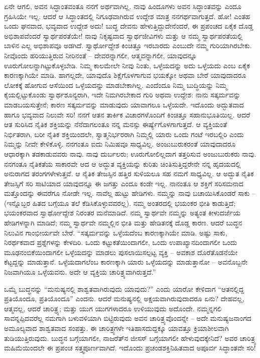 ಏನೇ ಆಗಲಿ, ಅವನ ಸಿದ್ಧಾಂತವಂತೂ ನನಗೆ ಅರ್ಥವಾಗಿಲ್ಲ. ನಾವು ಹಿಂದೂಗಳು ಅವನ ಸಿದ್ಧಾಂತವನ್ನು ಎಂದೂ ಗ್ರಹಿಸಿಯೇ ಇಲ್ಲ. ಆದರೆ ಆ ಸಿದ್ಧಾಂತದಲ್ಲಿ ನಿಗೂಢವಾಗಿರುವ ಉದ್ದೇಶ ಮಾತ್ರ ನನಗರ್ಥವಾಗುತ್ತದೆ. ಹೋ! ಎಂತಹ ಒಂದು ಘನವಾದ, ಭವ್ಯವಾದ ಉದ್ದೇಶ ಅದು! ಬುದ್ಧ ದೇವನು ಹೇಳುತ್ತಿದ್ದುದೇನೆಂದರೆ, ಈ ಪ್ರಪಂಚದ ಏಕೈಕ ದೊಡ್ಡ ಅಭಿಶಾಪವೆಂದರೆ ಸ್ವಾರ್ಥಪರತೆಯೇ! ನಾವು ನಿಕೃಷ್ಟವಾದ ಸ್ವಾರ್ಥಜೀವಿಗಳು ಮತ್ತು ಆ ನಮ್ಮ ಸ್ವಾರ್ಥಪರತೆಯಲ್ಲಿ ಬಾಳಿನ ಎಲ್ಲ ಅಭಿಶಾಪವೂ ಅಡಗಿದೆ. ಸ್ವಾರ್ಥೋದ್ದೇಶ ಕಿಂಚಿತ್ತೂ ಇರಬಾರದು ಎಂಬುದೇ ನಮ್ಮ ಗುರಿಯಾಗಿರಬೇಕು. ನೀವೊಂದು ಹರಿಯುತ್ತಿರುವ ನೀರಿನಂತೆ – ದೇವರನ್ನಾಗಲೀ, ಆತ್ಮವನ್ನಾಗಲೀ, ಯಾವುದನ್ನೂ ಊರುಗೋಲನ್ನಾಗಿಟ್ಟುಕೊಳ್ಳಬೇಡಿ. ನಿಮ್ಮ ಕಾಲಮೇಲೇ ನೀವು ನಿಂತು, ಒಳ್ಳೆಯದನ್ನು ಅದು ಒಳ್ಳೆಯದು ಎಂಬ ಏಕೈಕ ಕಾರಣಕ್ಕಾಗಿಯೇ ಮಾಡಿ. ಹಾಗಲ್ಲದೇ, ಯಾವುದೊ ಶಿಕ್ಷೆಗೊಳಗಾಗುವ ಭಯಕ್ಕೋ ಅಥವಾ ಬೇರೆ ಯಾವುದಾದರೂ ಲೋಕಕ್ಕೆ ಹೋಗುವ ಆಸೆಯಿಂದ ಒಳ್ಳೆಯದನ್ನು ಮಾಡಬೇಕಾಗಿಲ್ಲ. ಎಂದೆಂದೂ ನಿಮ್ಮ ಬುದ್ಧಿಯನ್ನು ನಿಮ್ಮ ಕೈಯಲ್ಲಿಟ್ಟುಕೊಂಡು ಸ್ವಾರ್ಥಶೂನ್ಯರಾಗಿ, ಇದೇ ನಿಮಗಿರಬೇಕಾದ ಗುರಿ ಅಥವಾ ಉದ್ದೇಶ: ನಾನು ಸತ್ಕರ್ಮವನ್ನು ಮಾಡಬಯಸುತ್ತೇನೆ; ಕಾರಣ ಸತ್ಕರ್ಮವನ್ನು ಮಾಡುವುದು ಯಾವಾಗಲೂ ಒಳ್ಳೆಯದೇ. ಇದೊಂದು ಅದ್ಭುತವಾದ ಹಾಗೂ ಭವ್ಯವಾದ ನಿಲುವೇ ಸರಿ! ನನಗೆ ಆತನ ತಾರ್ಕಿಕ ವಿಚಾರಗಳೊಂದಿಗೆ ಕಿಂಚಿತ್ತೂ ಸಹಾನುಭೂತಿಯಿಲ್ಲ. ಆದರೆ ಆತ ಸುರಿಸಿದ ನೈತಿಕ ಶಕ್ತಿಯನ್ನು ನೆನೆದಾಗಲಂತೂ ನನ್ನ ಮನಸ್ಸು ಈರ್ಷ್ಯೆಗೊಳಗಾಗುತ್ತದೆ. ಆ ವ್ಯಕ್ತಿಯಂತೆ ನಿರ್ಭಿತರಾಗಿ, ಬರೀ ನೈತಿಕ ಶಕ್ತಿಯಿಂದಲೇ, ಸ್ವಾತ್ಮನಿರ್ಭರರಾಗಿ ನಿಮ್ಮಲ್ಲಿ ಯಾರು ಒಂದು ಗಂಟೆ ಇರಬಲ್ಲಿರಿ ಎಂದು ನಿಮ್ಮನ್ನು ನೀವೇ ಕೇಳಿಕೊಳ್ಳಿ. ನನಗಂತೂ ಐದು ನಿಮಿಷವೂ ಸಾಧ್ಯವಿಲ್ಲ. ಅಂಜುಬುರುಕರಂತೆ ಯಾವುದಾದರೂ ಆಧಾರಕ್ಕಾಗಿ ತಡಕಾಡುವವರು ನಾವು. ನಾವು ದುರ್ಬಲರು; ಊರುಗೋಲಿಲ್ಲದಾಗ ತತ್ತರಿಸುವ ಅಂಜುಬುರುಕರು ನಾವು. ನನಗಂತೂ ನೈತಿಕತೆಯ ಸಾಕಾರವೇ ಆದ ಆ ಅದ್ಭುತ ವ್ಯಕ್ತಿಯನ್ನು ಕುರಿತು ಚಿಂತಿಸುತ್ತಿದ್ದರೇನೇ ನನ್ನ ಹೃದಯದಲ್ಲಿ ಅನುರಾಗದ ತರಂಗಗಳೇಳುತ್ತವೆ. ಆ ನೈತಿಕ ತೇಜಸ್ಸಿನ ಹತ್ತಿರ ಸುಳಿಯಲೂ ಸಹ ನಮಗೆ ಸಾಧ್ಯವಿಲ್ಲ. ಆ ಅದ್ಭುತ ನೈತಿಕ ತೇಜಸ್ಸಿಗೆ ಸರಿ ಸಾಟಿಯಾದ ಯಾವುದನ್ನೂ ಈ ಜಗತ್ತು ಎಂದೂ ಕಂಡೇ ಇಲ್ಲ. ನಾನಂತೂ ಆ ಶಕ್ತಿಗೆ ಸರಿಸಮನಾದ ಮತ್ತೊಂದನ್ನು ಈವರೆಗೂ ನೋಡೇ ಇಲ್ಲ. ನಾವೆಲ್ಲ ಹುಟ್ಟು ಹೇಡಿಗಳು. ನಮ್ಮನ್ನು ನಾವು ಬಚಾಯಿಸಿಕೊಂಡರೆ ಸಾಕು – (ಇನ್ನೊಬ್ಬರ ಹಿತದ ಬಗ್ಗೆಯೂ ತಲೆ ಕೆಡಿಸಿಕೊಳ್ಳುವವರಲ್ಲ). ನಮ್ಮ ಅಂತರದಲ್ಲಿ ಭಯಂಕರ ಭೀತಿ ಕಾಡುತ್ತಿದೆ; ಭಯಂಕರವಾದ ಸ್ವಾರ್ಥೋದ್ದೇಶ ನಿರಂತರ ಮನೆಮಾಡಿದೆ. ನಮ್ಮ ಸ್ವಾರ್ಥವೇ ನಮ್ಮನ್ನು ಅತ್ಯಂತ ಕೀಳುದರ್ಜೆಯ ಹೇಡಿಗಳನ್ನಾಗಿ ಮಾಡಿದೆ; ನಮ್ಮ ಸ್ವಾರ್ಥವೇ ನಮ್ಮಲ್ಲಿನ ಭೀತಿ ಮತ್ತು ಹೇಡಿತನಕ್ಕೆ ದೊಡ್ಡ ಕಾರಣ. ಆದರೆ ಬುದ್ಧನ ನಿಲುವಿನ ಗಾಂಭೀರ್ಯವೇ ಬೇರೆ. “ಸತ್ಕರ್ಮವನ್ನು ಒಳ್ಳೆಯದೆಂಬ ಕಾರಣಕ್ಕಾಗಿಯೇ ಮಾಡಿ. ಅಷ್ಟು ಸಾಕು, ನಿರರ್ಥಕವಾದ ಪ್ರಶ್ನೆಗಳನ್ನು ಕೇಳದಿರಿ. ಒಂದು ಕಟ್ಟುಕತೆಯಿಂದಾಗಲೀ, ಒಂದು ಉಪಾಖ್ಯಾನದಿಂದಾಗಲೀ ಒಂದು ಮೂಢನಂಬಿಕೆಯಿಂದಾಗಲೀ ಒಳ್ಳೆಯದನ್ನು ಮಾಡಲು ಪುಸಲಾಯಿಸಲ್ಪಟ್ಟ ವ್ಯಕ್ತಿ – ಅವಕಾಶ ದೊರೆತೊಡನೆಯೇ ಕೆಟ್ಟದ್ದನ್ನು ಮಾಡುತ್ತಾನೆ. ಒಳ್ಳೆಯದಾಗಲೆಂಬ ಕಾರಣಕ್ಕಾಗಿ ಯಾರು ಒಳ್ಳೆಯದನ್ನು ಮಾಡುತ್ತಾನೋ – ಅವನೊಬ್ಬನೇ ನಿಜವಾಗಿಯೂ ಒಳ್ಳೆಯವನು. ಅದೇ ಆ ವ್ಯಕ್ತಿಯ ಚಾರಿತ್ರ್ಯವಾಗಿರುತ್ತದೆ.”

ಒಮ್ಮೆ ಬುದ್ಧನನ್ನು “ಮನುಷ್ಯನಲ್ಲಿ ಶಾಶ್ವತವಾಗಿರುವುದು ಯಾವುದು?” ಎಂದು ಯಾರೋ ಕೇಳಿದಾಗ “ಆತನಲ್ಲಿದ್ದ ಪ್ರತಿಯೊಂದೂ, ಪ್ರತಿಯೊಂದೂ” ಎಂದನು. ಆದರೆ ಮನುಷ್ಯನಲ್ಲಿ ಅಕ್ಷಯವಾಗಿರುವುದಾದರೂ ಏನು? ದೇಹವಲ್ಲ, ಆತ್ಮವಲ್ಲ, ಆದರೆ ಚಾರಿತ್ರ್ಯ; ಮತ್ತು ಯುಗ ಯುಗಗಳಾದರೂ ಉಳಿಯುವುದು ಅದೊಂದೇ. ನಮ್ಮನ್ನಗಲಿ ಸಾವನ್ನಪ್ಪಿದವರೆಲ್ಲ ನಮಗಾಗಿ ಬಳುವಳಿಯಾಗಿ ಬಿಟ್ಟಿರುವುದು ಅವನ ಚಾರಿತ್ರ್ಯವೊಂದನ್ನೇ – ಅದೇ ಮನುಷ್ಯಜನಾಂಗದ ಅಮೂಲ್ಯವಾದ ಶಾಶ್ವತವಾದ ಸಂಪತ್ತು. ಈ ಚಾರಿತ್ರ್ಯಗಳೇ ಇತಿಹಾಸದುದ್ದಕ್ಕೂ ಯಾವತ್ತೂ ಕ್ರಿಯಾಶೀಲವಾಗಿ ತುಡಿಯುತ್ತಿರುವುದು. ಬುದ್ಧನ ಬಗ್ಗೆಯಾಗಲೀ, ನಾಜರೆತ್‌ನ ಜೀಸಸ್ ಬಗ್ಗೆಯಾಗಲೀ ಹೇಳುವುದಕ್ಕೇನಿದೆ? ಅವರ ಚಾರಿತ್ರ್ಯ ಮಹಿಮೆಯಿಂದಲೇ ಈ ಪ್ರಪಂಚ ಸತ್ತ್ವಪೂರ್ಣವಾಗಿದೆ. ಇದೊಂದು ಪ್ರಚಂಡಶಕ್ತಿನಿಹಿತವಾದ ಅಪೂರ್ವ ಸಿದ್ಧಾಂತವೇ ಸರಿ!

